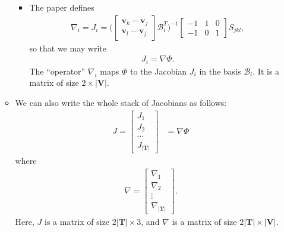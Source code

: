 \documentclass[10pt]{article}
\newcommand{\ve}[1]{\mathbf{#1}}
\newcommand{\mcal}[1]{\mathcal{#1}}
\begin{document}
\begin{itemize}
\begin{itemize}
\begin{itemize}
            \item The paper defines
            \begin{align*}
                \nabla_i = J_i = \bigg( \begin{bmatrix}
                    \ve{v}_k - \ve{v}_j \\ 
                    \ve{v}_l - \ve{v}_j
                \end{bmatrix}
                \mcal{B}_i^T \bigg)^{-1} \begin{bmatrix} -1 & 1 & 0 \\ -1 & 0 & 1 \end{bmatrix}  S_{jkl},
            \end{align*}
            so that we may write
            \begin{align*}
                J_i = \nabla \Phi.
            \end{align*}
            The ``operator'' $\nabla_i$ maps $\Phi$ to the Jacobian $J_i$ in the basis $\mcal{B}_i$. It is a matrix of size $2 \times |\mathbf{V}|$.
        \end{itemize}
        \item We can also write the whole stack of Jacobians as follows:
        \begin{align*}
            J = \begin{bmatrix}
                J_1 \\ J_2 \\ \cdots \\ J_{|\ve{T}|}                
            \end{bmatrix}
            &= \nabla \Phi 
        \end{align*}
        where
        \begin{align*}
            \nabla = \begin{bmatrix}
                \nabla_1 \\ \nabla_2 \\ \vdots \\ \nabla_{|\ve{T}|}
            \end{bmatrix}.
        \end{align*}
        Here, $J$ is a matrix of size $2|\ve{T}| \times 3$, and $\nabla$ is a matrix of size $2|\ve{T}| \times |\ve{V}|$.
    \end{itemize}


\end{itemize}
\end{document}
